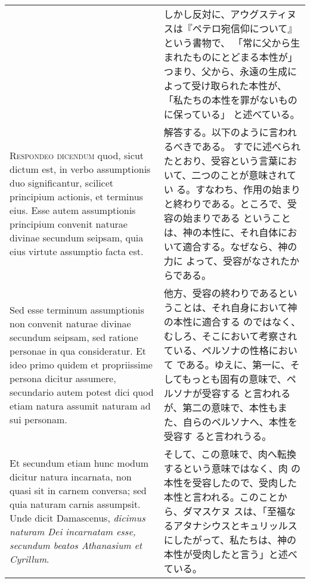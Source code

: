 \documentclass[10pt]{jsarticle} %
\begin{document}
\begin{longtable}{p{21em}p{21em}}
&

しかし反対に、アウグスティヌスは『ペテロ宛信仰について』という書物で、
 「常に父から生まれたものにとどまる本性が」つまり、父から、永遠の生成に
 よって受け取られた本性が、「私たちの本性を罪がないものに保っている」
 と述べている。

\\




{\scshape Respondeo dicendum} quod, sicut dictum est, in verbo assumptionis duo
 significantur, scilicet principium actionis, et terminus eius. Esse
 autem assumptionis principium convenit naturae divinae secundum
 seipsam, quia eius virtute assumptio facta est. 




&

解答する。以下のように言われるべきである。
すでに述べられたとおり、受容という言葉において、二つのことが意味されてい
 る。すなわち、作用の始まりと終わりである。ところで、受容の始まりである
 ということは、神の本性に、それ自体において適合する。なぜなら、神の力に
 よって、受容がなされたからである。


\\


Sed esse terminum
 assumptionis non convenit naturae divinae secundum seipsam, sed ratione
 personae in qua consideratur. Et ideo primo quidem et propriissime
 persona dicitur assumere, secundario autem potest dici quod etiam
 natura assumit naturam ad sui personam. 


&


他方、受容の終わりであるということは、それ自身において神の本性に適合する
 のではなく、むしろ、そこにおいて考察されている、ペルソナの性格において
 である。ゆえに、第一に、そしてもっとも固有の意味で、ペルソナが受容する
 と言われるが、第二の意味で、本性もまた、自らのペルソナへ、本性を受容す
 ると言われうる。

\\


Et secundum etiam hunc modum
 dicitur natura incarnata, non quasi sit in carnem conversa; sed quia
 naturam carnis assumpsit. Unde dicit Damascenus, {\itshape dicimus naturam Dei
 incarnatam esse, secundum beatos Athanasium et Cyrillum}.


&

そして、この意味で、肉へ転換するという意味ではなく、肉
 の本性を受容したので、受肉した本性と言われる。このことから、ダマスケヌ
 スは、「至福なるアタナシウスとキュリッルスにしたがって、私たちは、神の
 本性が受肉したと言う」と述べている。




\end{longtable}
\end{document}
